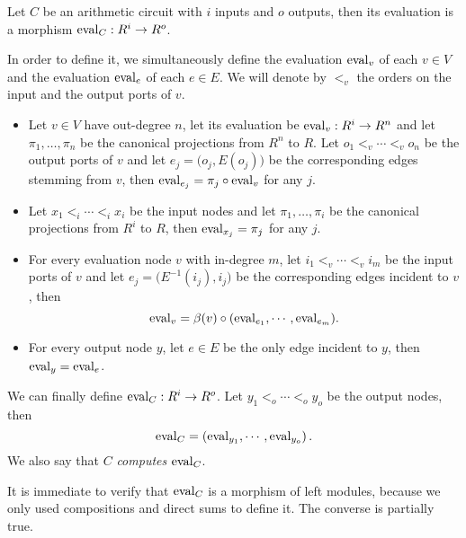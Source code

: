 \begin{definition}
  \label{def:eval}
  Let $C$ be an arithmetic circuit with $i$ inputs and $o$ outputs,
  then its evaluation is a morphism $\operatorname{eval}_C:R^i\rightarrow
  R^o$.

  In order to define it, we simultaneously define the evaluation
  $\operatorname{eval}_v$ of each $v\in V$ and the evaluation $\operatorname{eval}_e$ of each
  $e\in E$. We will denote by $<_v$ the orders on the input and the
  output ports of $v$.
  \begin{itemize}
  \item Let $v\in V$ have out-degree $n$, let its evaluation be
    $\operatorname{eval}_v:R^i\rightarrow R^n$ and let $\pi_1,\ldots,\pi_n$ be the canonical
    projections from $R^n$ to $R$. Let $o_1<_v\cdots<_vo_n$ be the
    output ports of $v$ and let $e_j=\bigl(o_j,E(o_j)\bigr)$ be the
    corresponding edges stemming from $v$, then $\operatorname{eval}_{e_j} =
    \pi_j\circ\operatorname{eval}_v$ for any $j$.
  \item Let $x_1<_i\cdots<_ix_i$ be the input nodes and let
    $\pi_1,\ldots,\pi_i$ be the canonical projections from $R^i$ to
    $R$, then $\operatorname{eval}_{x_j}=\pi_j$ for any $j$.
  \item For every evaluation node $v$ with in-degree $m$, let
    $i_1<_v\cdots<_vi_m$ be the input ports of $v$ and let
    $e_j=\bigl(E^{-1}(i_j),i_j\bigr)$ be the corresponding edges
    incident to $v$, then
    \begin{equation}
      \label{eq:eval_v}
      \operatorname{eval}_v = \beta(v) \circ (\operatorname{eval}_{e_1}, \cdots,\operatorname{eval}_{e_m})
      \text{.}
    \end{equation}
  \item For every output node $y$, let $e\in E$ be the only edge
    incident to $y$, then $\operatorname{eval}_y=\operatorname{eval}_e$.
  \end{itemize}

  We can finally define $\operatorname{eval}_C:R^i\rightarrow R^o$. Let $y_1<_o\cdots<_oy_o$
  be the output nodes, then
  \begin{equation}
    \label{eq:eval}
    \operatorname{eval}_C = \left(\operatorname{eval}_{y_1}, \cdots,\operatorname{eval}_{y_o}\right)
    \text{.}
  \end{equation}
  We also say that $C$ \emph{computes} $\operatorname{eval}_C$.
\end{definition}

It is immediate to verify that $\operatorname{eval}_C$ is a morphism of left
modules, because we only used compositions and direct sums to define
it. The converse is partially true.

